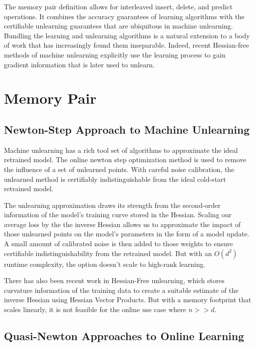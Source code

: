 \documentclass[a4paper,12pt]{article}
\begin{document}
The memory pair definition allows for interleaved insert, delete, and predict operations. It combines the accuracy guarantees of learning algorithms with the certifiable unlearning guarantees that are ubiquitous in machine unlearning. Bundling the learning and unlearning algorithms is a natural extension to a body of work that has increasingly found them inseparable. Indeed, recent Hessian-free methods of machine unlearning explicitly use the learning process to gain gradient information that is later used to unlearn\cite{Qiao_Zhang_Tang_Wei_2024-04}.

\section{Memory Pair}
\label{sec:memory-pair}

\subsection{Newton-Step Approach to Machine Unlearning}

Machine unlearning has a rich tool set of algorithms to approximate the ideal retrained model. The online newton step optimization method is used to remove the influence of a set of unlearned points. With careful noise calibration, the unlearned method is certifiably indistinguishable from the ideal cold-start retrained model.

The unlearning approximation draws its strength from the second-order information of the model's training curve stored in the Hessian. Scaling our average loss by the the inverse Hessian allows us to approximate the impact of those unlearned points on the model's parameters in the form of a model update. A small amount of calibrated noise is then added to those weights to ensure certifiable indistinguishability from the retrained model. But with an $O(d^{2})$ runtime complexity, the option doesn't scale to high-rank learning.

There has also been recent work in Hessian-Free unlearning, which stores curvature information of the training data to create a suitable estimate of the inverse Hessian using Hessian Vector Products. But with a memory footprint that scales linearly, it is not feasible for the online use case where $n>>d$.

\subsection{Quasi-Newton Approaches to Online Learning}
\end{document}
